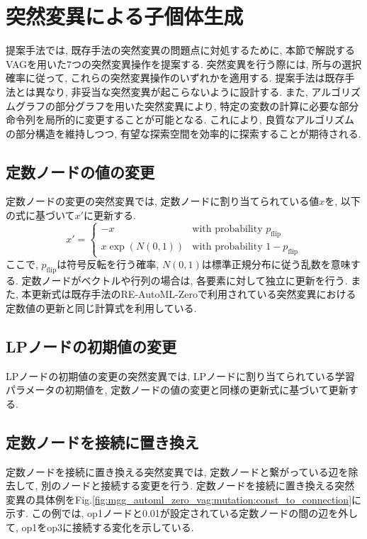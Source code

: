 \documentclass[11pt,oneside,openany,report]{jsbook}
\begin{document}
\section{突然変異による子個体生成}\label{sec:proposed:mutation}

提案手法では, 既存手法の突然変異の問題点に対処するために, 本節で解説するVAGを用いた7つの突然変異操作を提案する. 突然変異を行う際には, 所与の選択確率に従って, これらの突然変異操作のいずれかを適用する. 提案手法は既存手法とは異なり, 非妥当な突然変異が起こらないように設計する. また, アルゴリズムグラフの部分グラフを用いた突然変異により, 特定の変数の計算に必要な部分命令列を局所的に変更することが可能となる. これにより, 良質なアルゴリズムの部分構造を維持しつつ, 有望な探索空間を効率的に探索することが期待される.

\subsection{定数ノードの値の変更}
定数ノードの変更の突然変異では, 定数ノードに割り当てられている値$x$を, 以下の式に基づいて$x'$に更新する.
\begin{equation*}
  x' = \begin{cases}
    -x & \text{with probability } p_\mathrm{flip} \\
    x \exp(N(0,1)) & \text{with probability } 1 - p_\mathrm{flip}
  \end{cases}
\end{equation*}
\noindent
ここで, $p_\mathrm{flip}$は符号反転を行う確率, $N(0,1)$は標準正規分布に従う乱数を意味する. 定数ノードがベクトルや行列の場合は, 各要素に対して独立に更新を行う. また, 本更新式は既存手法のRE-AutoML-Zeroで利用されている突然変異における定数値の更新と同じ計算式を利用している.

\subsection{LPノードの初期値の変更}
LPノードの初期値の変更の突然変異では, LPノードに割り当てられている学習パラメータの初期値を, 定数ノードの値の変更と同様の更新式に基づいて更新する.

\subsection{定数ノードを接続に置き換え}
定数ノードを接続に置き換える突然変異では, 定数ノードと繋がっている辺を除去して, 別のノードと接続する変更を行う. 定数ノードを接続に置き換える突然変異の具体例をFig.\ref{fig:mgg_automl_zero_vag:mutation:const_to_connection}に示す. この例では, op1ノードと0.01が設定されている定数ノードの間の辺を外して, op1をop3に接続する変化を示している.
\end{document}
